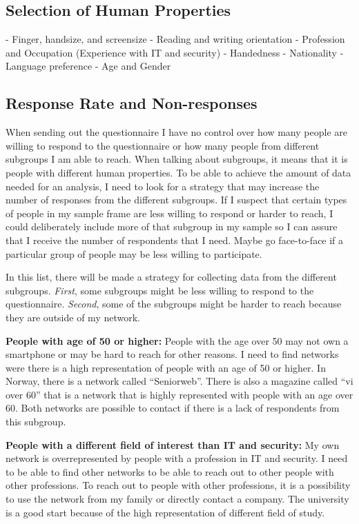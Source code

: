       \subsection{Selection of Human Properties}
        - Finger, handsize, and screensize
        - Reading and writing orientation
        - Profession and Occupation
          (Experience with IT and security)
        - Handedness
        - Nationality
        - Language preference
        - Age and Gender
  
  \clearpage
  \subsection{Response Rate and Non-responses} \label{sec:response}

    When sending out the questionnaire I have no control over how many people are willing to respond to the questionnaire or how many people from different subgroups I am able to reach. When talking about subgroups, it means that it is people with different human properties. To be able to achieve the amount of data needed for an analysis, I need to look for a strategy that may increase the number of responses from the different subgroups. If I suspect that certain types of people in my sample frame are less willing to respond or harder to reach, I could deliberately include more of that subgroup in my sample so I can assure that I receive the number of respondents that I need. Maybe go face-to-face if a particular group of people may be less willing to participate.

    In this list, there will be made a strategy for collecting data from the different subgroups. {\it First}, some subgroups might be less willing to respond to the questionnaire. {\it Second}, some of the subgroups might be harder to reach because they are outside of my network.

    {\bf People with age of 50 or higher:} People with the age over 50 may not own a smartphone or may be hard to reach for other reasons. I need to find networks were there is a high representation of people with an age of 50 or higher. In Norway, there is a network called ``Seniorweb''. There is also a magazine called ``vi over 60'' that is a network that is highly represented with people with an age over 60. Both networks are possible to contact if there is a lack of respondents from this subgroup.

    {\bf People with a different field of interest than IT and security:} My own network is overrepresented by people with a profession in IT and security. I need to be able to find other networks to be able to reach out to other people with other professions. To reach out to people with other professions, it is a possibility to use the network from my family or directly contact a company. The university is a good start because of the high representation of different field of study.

